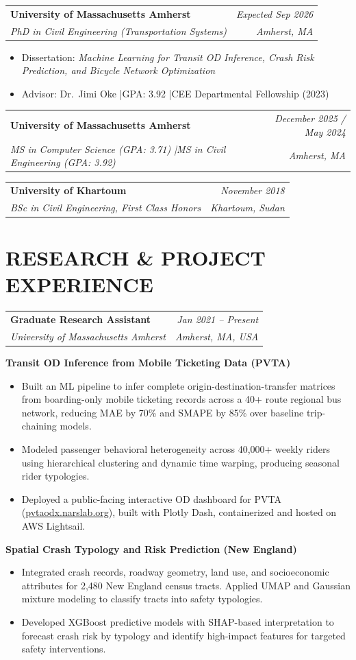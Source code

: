 \documentclass[10pt, a4paper]{article}
\makeatletter
\newcommand{\entry}[4]{%
  \noindent
  \begin{tabularx}{\linewidth}{@{}X@{\hspace{4pt}}r@{}}
    \textbf{#1} & \textit{\small\color{subtle}#2} \\
    \textit{\small\color{subtle}#3} & \textit{\small\color{subtle}#4}
  \end{tabularx}\vspace{2pt}%
}
\makeatother
\begin{document}
\entry{University of Massachusetts Amherst}{Expected Sep 2026}
      {PhD in Civil Engineering (Transportation Systems)}{Amherst, MA}
\begin{itemize}
  \item Dissertation: \textit{Machine Learning for Transit OD Inference, Crash Risk Prediction, and Bicycle Network Optimization}
  \item Advisor: Dr.\ Jimi Oke \quad|\quad GPA: 3.92 \quad|\quad CEE Departmental Fellowship (2023)
\end{itemize}
\vspace{3pt}
\entry{University of Massachusetts Amherst}{December 2025 / May 2024}
      {MS in Computer Science (GPA: 3.71) \quad|\quad MS in Civil Engineering (GPA: 3.92)}{Amherst, MA}
\vspace{3pt}
\entry{University of Khartoum}{November 2018}
      {BSc in Civil Engineering, First Class Honors}{Khartoum, Sudan}

\section{RESEARCH \& PROJECT EXPERIENCE}

\entry{Graduate Research Assistant}{Jan 2021 -- Present}
      {University of Massachusetts Amherst}{Amherst, MA, USA}

\vspace{4pt}
\textbf{Transit OD Inference from Mobile Ticketing Data (PVTA)}
\begin{itemize}
  \item Built an ML pipeline to infer complete origin-destination-transfer matrices from boarding-only mobile ticketing records across a 40+ route regional bus network, reducing MAE by 70\% and SMAPE by 85\% over baseline trip-chaining models.
  \item Modeled passenger behavioral heterogeneity across 40,000+ weekly riders using hierarchical clustering and dynamic time warping, producing seasonal rider typologies.
  \item Deployed a public-facing interactive OD dashboard for PVTA (\href{https://pvtaodx.narslab.org}{pvtaodx.narslab.org}), built with Plotly Dash, containerized and hosted on AWS Lightsail.
\end{itemize}

\vspace{4pt}
\textbf{Spatial Crash Typology and Risk Prediction (New England)}
\begin{itemize}
  \item Integrated crash records, roadway geometry, land use, and socioeconomic attributes for 2,480 New England census tracts. Applied UMAP and Gaussian mixture modeling to classify tracts into safety typologies.
  \item Developed XGBoost predictive models with SHAP-based interpretation to forecast crash risk by typology and identify high-impact features for targeted safety interventions.
\end{itemize}
\end{document}
